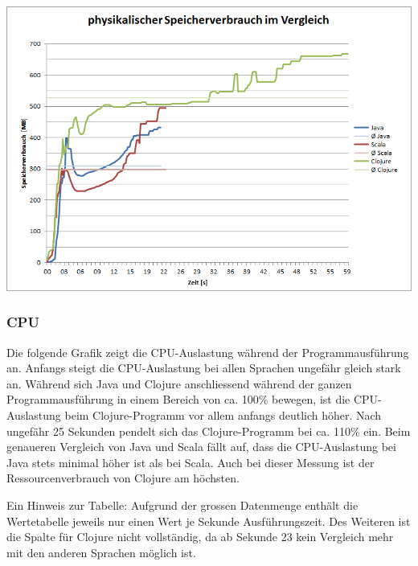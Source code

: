 \documentclass{fancydocument}
\begin{document}
\begin{center}
\includegraphics[width=\linewidth]{bilder/MemoryAll.png}
\end{center}
\subsubsection{CPU}
Die folgende Grafik zeigt die CPU-Auslastung während der Programmausführung an. Anfangs steigt die CPU-Auslastung bei allen Sprachen ungefähr gleich stark an. Während sich Java und Clojure anschliessend während der ganzen Programmausführung in einem Bereich von ca. 100\% bewegen, ist die CPU-Auslastung beim Clojure-Programm vor allem anfangs deutlich höher. Nach ungefähr 25 Sekunden pendelt sich das Clojure-Programm bei ca. 110\% ein. Beim genaueren Vergleich von Java und Scala fällt auf, dass die CPU-Auslastung bei Java stets minimal höher ist als bei Scala. Auch bei dieser Messung ist der Ressourcenverbrauch von Clojure am höchsten.

\bigskip
\noindent
Ein Hinweis zur Tabelle: Aufgrund der grossen Datenmenge enthält die Wertetabelle jeweils nur einen Wert je Sekunde Ausführungszeit. Des Weiteren ist die Spalte für Clojure nicht vollständig, da ab Sekunde 23 kein Vergleich mehr mit den anderen Sprachen möglich ist.
\end{document}
